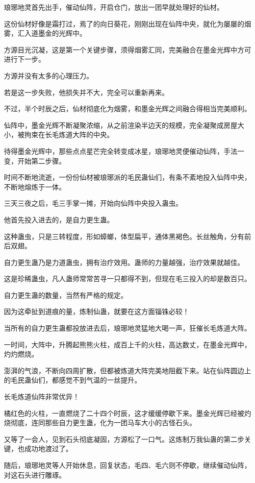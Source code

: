 \begin{this_body}
琅琊地灵首先出手，催动仙阵，开启仓门，放出一团早就处理好的仙材。

这份仙材好像是霜打过，焉了的向日葵花，刚刚出现在仙阵中央，就化为屡屡的烟雾，汇入道墨金的光辉中。

方源目光沉凝，这是第一个关键步骤，须得烟雾汇同，完美融合在墨金光辉中方可进行下一步。

方源并没有太多的心理压力。

若是这一步失败，他损失并不大，完全可以重新再来。

不过，半个时辰之后，仙材彻底化为烟雾，和墨金光辉之间融合得相当完美顺利。

仙阵中，墨金光辉不断凝聚浓缩，从之前渲染半边天的规模，完全凝聚成房屋大小，被拘束在长毛炼道大阵的中央。

待得墨金光辉中，那些点点星芒完全转变成冰星，琅琊地灵便催动仙阵，手法一变，开始第二步骤。

时间不断地流逝，一份份仙材被琅琊派的毛民蛊仙们，有条不紊地投入仙阵中央，不断地熔炼于一体。

三天三夜之后，毛三手掌一摊，开始向仙阵中央投入蛊虫。

他首先投入进去的，是自力更生蛊。

这种蛊虫，只是三转程度，形如蟑螂，体型扁平，通体黑褐色。长丝触角，分有前后双翅。

自力更生蛊乃是力道蛊虫，拥有治疗效用。蛊师的力量越强，治疗效果就越佳。

这是珍稀蛊虫，凡人蛊师常常苦寻一只都得不到，但现在毛三投入的却是数百只。

自力更生蛊的数量，当然有严格的规定。

因为这牵扯到道痕的量，炼制仙蛊，就要在这方面锱铢必较！

当所有的自力更生蛊都投放进去后，琅琊地灵猛地大喝一声，狂催长毛炼道大阵。

一时间，大阵中，升腾起熊熊火柱，成百上千的火柱，高达数丈，在墨金光辉中，灼灼燃烧。

澎湃的气浪，不断向四周扩散，但都被炼道大阵完美地阻截下来。站在仙阵圆边上的毛民蛊仙们，都感觉不到气温的一丝提升。

长毛炼道仙阵非常优异！

橘红色的火柱，一直燃烧了二十四个时辰，这才缓缓停歇下来。墨金光辉已经被灼烧彻底，连同那些自力更生蛊，化为一团马车大小的古怪石头。

又等了一会人，见到石头彻底凝固，方源松了一口气。这炼制万我仙蛊的第二步关键，也成功地渡过了。

随后，琅琊地灵等人开始休息，回复状态，毛四、毛六则不停歇，继续催动仙阵，对这石头进行雕琢。


\end{this_body}
